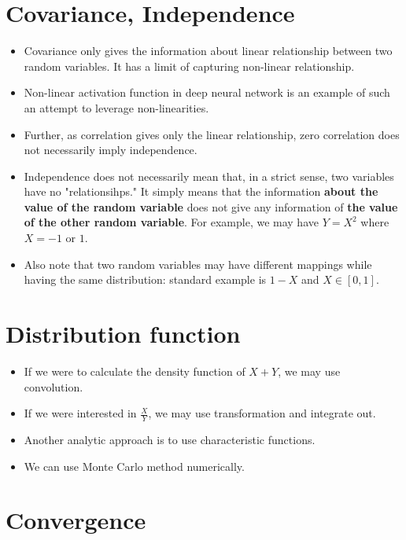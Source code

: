 \documentclass[11pt,reqno]{amsart}
\theoremstyle{remark}
\begin{document}
\section{Covariance, Independence}
\begin{itemize}
\item Covariance only gives the information about linear relationship between two random variables. It has a limit of capturing non-linear relationship.
\item Non-linear activation function in deep neural network is an example of such an attempt to leverage non-linearities.
\item Further, as correlation gives only the linear relationship, zero correlation does not necessarily imply independence.
\item Independence does not necessarily mean that, in a strict sense, two variables have no "relationsihps." It simply means
that the information \textbf{about the value of the random variable} does not give any information of \textbf{the value of the other random variable}. For example, we may have $Y=X^2$ where $X=-1$ or $1$.
\item Also note that two random variables may have different mappings while having the same distribution: standard example is $1-X$ and $X\in [0,1]$.
\end{itemize}

\section{Distribution function}
\begin{itemize}
\item If we were to calculate the density function of $X+Y$, we may use convolution.
\item If we were interested in $\frac XY$, we may use transformation and integrate out. 
\item Another analytic approach is to use characteristic functions.
\item We can use Monte Carlo method numerically.

\end{itemize}

\section{Convergence}
\end{document}
